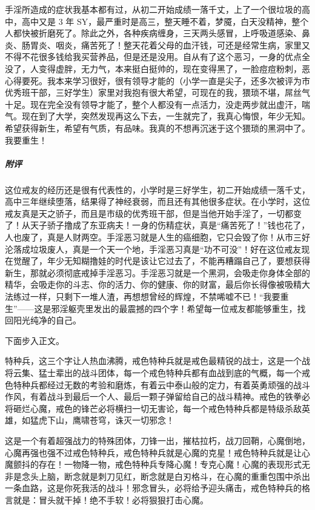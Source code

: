\begin{case}
    手淫所造成的症状我基本都有过，从初二开始成绩一落千丈，上了一个很垃圾的高中，高中又是 3 年 SY，最严重时是高三，整天睡不着，梦魇，白天没精神，整个人都快被折磨死了。除此之外，各种疾病缠身，三天两头感冒，上呼吸道感染、鼻炎、肠胃炎、咽炎，痛苦死了！整天花着父母的血汗钱，可还是经常生病，家里又不得不花很多钱给我买营养品，但是还是没用。自从有了这个恶习，一身的优点全没了，人变得虚胖，无力气，本来挺白挺帅的，现在变得黑了，一脸痘痘粉刺，恶心得要死。我本来学习很好，很有领导才能的（小学一直是尖子，还多次被评为市优秀班干部，三好学生）家里对我抱有很大希望，可现在的我，猥琐不堪，屌丝气十足。现在完全没有领导才能了，整个人都没有一点活力，没走两步就出虚汗，喘气。现在到了大学，突然发现再这么下去，一生就完了，我真心悔恨，年少无知。希望获得新生，希望有气质，有品味。我真的不想再沉迷于这个猥琐的黑洞中了。我要重生！
    \subparagraph{附评} 这位戒友的经历还是很有代表性的，小学时是三好学生，初二开始成绩一落千丈，高中三年继续堕落，结果得了神经衰弱，而且还有其他很多症状。在小学时，这位戒友真是天之骄子，而且是市级的优秀班干部，但是当他开始手淫了，一切都变了！从天子骄子撸成了东亚病夫！一身的伤精症状，真是“痛苦死了！”钱也花了，人也废了，真是人财两空。手淫恶习就是人生的癌细胞，它只会毁了你！从市三好沦落成垃圾废人，真是一个天一个地，手淫恶习真是“功不可没”！好在这位戒友现在觉醒了，年少无知糊撸娃的时代是该让它过去了，不能再糟蹋自己了，要想获得新生，那就必须彻底戒掉手淫恶习。手淫恶习就是一个黑洞，会吸走你身体全部的精华，会吸走你的斗志、你的活力、你的健康、你的财富，最后你长得像被吸精大法练过一样，只剩下一堆人渣，再想想曾经的辉煌，不禁唏嘘不已！“我要重生”——这是邪淫躯壳里发出的最震撼的四个字！希望每一位戒友都能够重生，找回阳光纯净的自己。
\end{case}

下面步入正文。

特种兵，这三个字让人热血沸腾，戒色特种兵就是戒色最精锐的战士，这是一个战将云集、猛士辈出的战斗团体，每一个戒色特种兵都有血战到底的气概，每一个戒色特种兵都经过无数的考验和磨炼，有着云中泰山般的定力，有着英勇顽强的战斗作风，有着战斗到最后一个人、最后一颗子弹留给自己的战斗精神。戒色的铁拳必将砸烂心魔，戒色的锋芒必将横扫一切无害论，每一个戒色特种兵都是特级杀敌英雄，如猛虎下山，鹰啸苍穹，诛灭一切邪念！

这是一个有着超强战力的特殊团体，刀锋一出，摧枯拉朽，战刀回鞘，心魔倒地，心魔再强也强不过戒色特种兵，戒色特种兵就是心魔的克星！戒色特种兵就是让心魔颤抖的存在！一物降一物，戒色特种兵专降心魔！专克心魔！心魔的表现形式无非是念头上脑，断念就是刺刀见红，断念就是白刃格斗，在心魔的重重包围中杀出一条血路，这是你死我活的战斗！邪念冒头，必将给予迎头痛击，戒色特种兵的格言就是：冒头就干掉！绝不手软！必将狠狠打击心魔。

